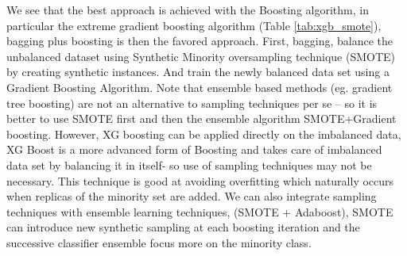 \documentclass[11pt]{article}
\theoremstyle{definition}
\theoremstyle{remark}
\begin{document}
We see that the best approach is achieved with the Boosting algorithm, in particular the extreme gradient boosting algorithm (Table \ref{tab:xgb_smote}), bagging plus boosting is then the favored approach. First, bagging, balance the unbalanced dataset using Synthetic Minority oversampling technique (SMOTE) by creating synthetic instances. And train the newly balanced data set using a Gradient Boosting Algorithm. Note that ensemble based methods (eg. gradient tree boosting) are not an alternative to sampling techniques per se – so it is better to use SMOTE first and then  the ensemble algorithm SMOTE+Gradient boosting. However, XG boosting can be applied directly on the imbalanced data, XG Boost is a more advanced form of Boosting and takes care of imbalanced data set by balancing it in itself- so use of sampling techniques may not be necessary. This technique is good at avoiding overfitting which naturally occurs when replicas of the minority set are added. 
We can also integrate sampling techniques with ensemble learning techniques,  (SMOTE + Adaboost), SMOTE can introduce new synthetic sampling at each boosting iteration and the successive classifier ensemble focus more on the minority class.


\end{document}

